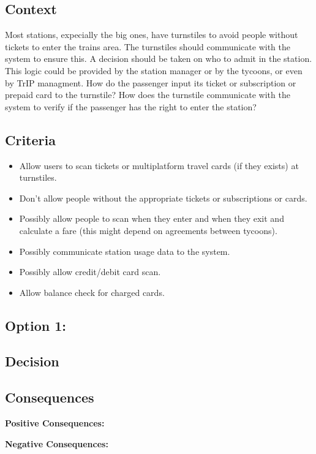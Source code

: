 \subsection*{Context}

Most stations, expecially the big ones, have turnstiles to avoid people without tickets to enter the trains area.
The turnstiles should communicate with the system to ensure this. A decision should be taken on who to admit in the station.
This logic could be provided by the station manager or by the tycoons, or even by TrIP managment.
How do the passenger input its ticket or subscription or prepaid card to the turnstile?
How does the turnstile communicate with the system to verify if the passenger has the right to enter the station?

\subsection*{Criteria}
\begin{itemize}
    \item Allow users to scan tickets or multiplatform travel cards (if they exists) at turnstiles.
    \item Don't allow people without the appropriate tickets or subscriptions or cards.
    \item Possibly allow people to scan when they enter and when they exit and calculate a fare (this might depend on agreements between tycoons). 
    \item Possibly communicate station usage data to the system.
    \item Possibly allow credit/debit card scan.
    \item Allow balance check for charged cards.
\end{itemize}

\subsection*{Option 1: }

\subsection*{Decision}

\subsection*{Consequences}
\textbf{Positive Consequences:}
\begin{itemize}
\end{itemize}
\textbf{Negative Consequences:}
\begin{itemize}
\end{itemize}